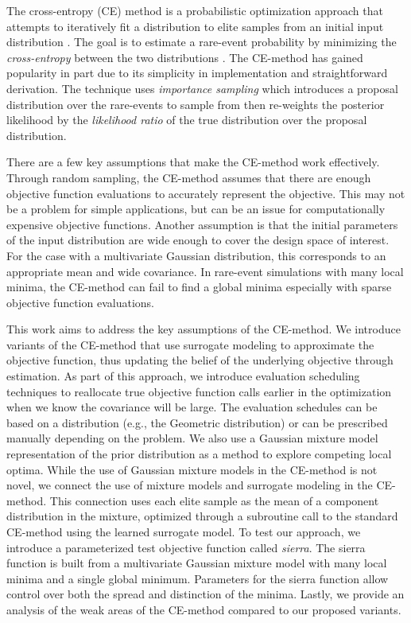 The cross-entropy (CE) method is a probabilistic optimization approach that attempts to iteratively fit a distribution to elite samples from an initial input distribution \cite{rubinstein2004cross,rubinstein1999cross}.
The goal is to estimate a rare-event probability by minimizing the \textit{cross-entropy} between the two distributions \cite{de2005tutorial}.
The CE-method has gained popularity in part due to its simplicity in implementation and straightforward derivation.
The technique uses \textit{importance sampling} which introduces a proposal distribution over the rare-events to sample from then re-weights the posterior likelihood by the \textit{likelihood ratio} of the true distribution over the proposal distribution.

There are a few key assumptions that make the CE-method work effectively.
Through random sampling, the CE-method assumes that there are enough objective function evaluations to accurately represent the objective. 
This may not be a problem for simple applications, but can be an issue for computationally expensive objective functions. 
Another assumption is that the initial parameters of the input distribution are wide enough to cover the design space of interest. For the case with a multivariate Gaussian distribution, this corresponds to an appropriate mean and wide covariance.
In rare-event simulations with many local minima, the CE-method can fail to find a global minima especially with sparse objective function evaluations.

This work aims to address the key assumptions of the CE-method.
We introduce variants of the CE-method that use surrogate modeling to approximate the objective function, thus updating the belief of the underlying objective through estimation.
As part of this approach, we introduce evaluation scheduling techniques to reallocate true objective function calls earlier in the optimization when we know the covariance will be large.
The evaluation schedules can be based on a distribution (e.g., the Geometric distribution) or can be prescribed manually depending on the problem.
We also use a Gaussian mixture model representation of the prior distribution as a method to explore competing local optima.
While the use of Gaussian mixture models in the CE-method is not novel, we connect the use of mixture models and surrogate modeling in the CE-method.
This connection uses each elite sample as the mean of a component distribution in the mixture, optimized through a subroutine call to the standard CE-method using the learned surrogate model.
To test our approach, we introduce a parameterized test objective function called \textit{sierra}.
The sierra function is built from a multivariate Gaussian mixture model with many local minima and a single global minimum.
Parameters for the sierra function allow control over both the spread and distinction of the minima.
Lastly, we provide an analysis of the weak areas of the CE-method compared to our proposed variants.


